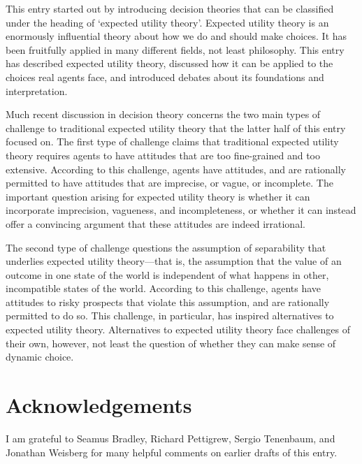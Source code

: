 This entry started out by introducing decision theories that can be classified under the heading of `expected utility theory'. Expected utility theory is an enormously influential theory about how we do and should make choices. It has been fruitfully applied in many different fields, not least philosophy. This entry has described expected utility theory, discussed how it can be applied to the choices real agents face, and introduced debates about its foundations and interpretation.

Much recent discussion in decision theory concerns the two main types of challenge to traditional expected utility theory that the latter half of this entry focused on. The first type of challenge claims that traditional expected utility theory requires agents to have attitudes that are too fine-grained and too extensive. According to this challenge, agents have attitudes, and are rationally permitted to have attitudes that are imprecise, or vague, or incomplete. The important question arising for expected utility theory is whether it can incorporate imprecision, vagueness, and incompleteness, or whether it can instead offer a convincing argument that these attitudes are indeed irrational.

The second type of challenge questions the assumption of separability that underlies expected utility theory---that is, the assumption that the value of an outcome in one state of the world is independent of what happens in other, incompatible states of the world. According to this challenge, agents have attitudes to risky prospects that violate this assumption, and are rationally permitted to do so. This challenge, in particular, has inspired alternatives to expected utility theory. Alternatives to expected utility theory face challenges of their own, however, not least the question of whether they can make sense of dynamic choice.

\section*{Acknowledgements}

I am grateful to Seamus Bradley, Richard Pettigrew, Sergio Tenenbaum, and Jonathan Weisberg for many helpful comments on earlier drafts of this entry.